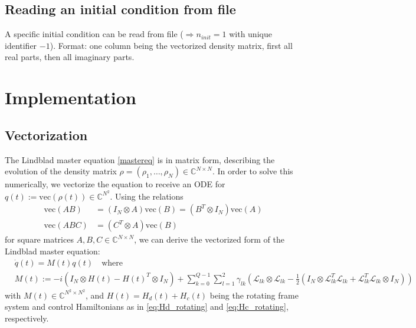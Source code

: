\documentclass[11pt]{article}
\newcommand{\Ell}{\mathcal{L}}
\newcommand{\C}{\mathds{C}}
\begin{document}
\subsection{Reading an initial condition from file}
A specific initial condition can be read from file ($\Rightarrow n_{init}=1$ with unique identifier $-1$). Format: one column being the vectorized density matrix, first all real parts, then all imaginary parts. 

\section{Implementation}

  \subsection{Vectorization}
  The Lindblad master equation \eqref{mastereq} is in matrix form, describing
  the evolution of the density matrix $\rho = (\rho_1, \dots, \rho_N) \in
  \C^{N\times N}$. In order to solve this numerically, we vectorize the equation
  to receive an ODE for $q(t) := \text{vec}(\rho(t)) \in \C^{N^2}$. Using the
  relations
  \begin{align}
   \text{vec}(AB) &= (I_N\otimes A)\text{vec}(B) = (B^T\otimes I_N)\text{vec}(A)
    \\
   \text{vec}(ABC) &= (C^T\otimes A)\text{vec}(B)
  \end{align}
  for square matrices $A,B,C\in\C^{N\times N}$, we can derive the vectorized
  form of the Lindblad master equation:
  \begin{align}\label{mastereq_vectorized}
    &\dot q(t) = M(t) q(t) \quad  \text{where} \\
    &M(t) := -i(I_N\otimes H(t) - H(t)^T \otimes I_N) + \sum_{k=0}^{Q-1}\sum_{l=1}^2 \gamma_{lk}
    \left( \Ell_{lk}\otimes \Ell_{lk} - \frac 1 2 \left( I_N\otimes
    \Ell^T_{lk}\Ell_{lk} + \Ell^T_{lk}\Ell_{lk} \otimes I_N \right) \right)
  \end{align}
   with $M(t) \in \C^{N^2\times N^2}$, and $H(t) = H_d(t) + H_c(t)$ being the rotating frame system and control Hamiltonians as in \eqref{eq:Hd_rotating} and \eqref{eq:Hc_rotating}, respectively.
\end{document}
